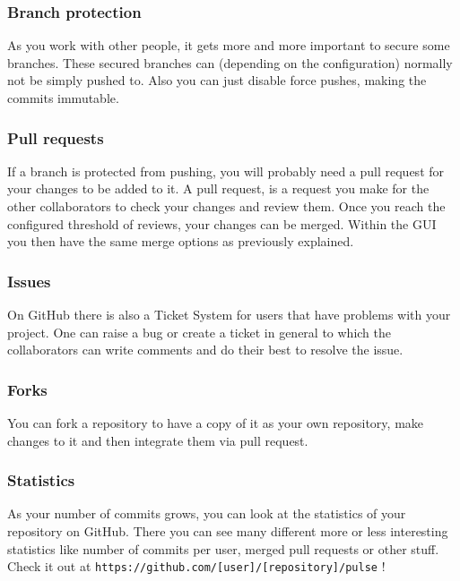 \documentclass[a4paper, 12pt]{article}
\begin{document}
		\subsubsection{Branch protection}
		
			As you work with other people, it gets more and more important to secure some branches. These secured branches can (depending on the configuration) normally not be simply pushed to. Also you can just disable force pushes, making the commits immutable.
		
		\subsubsection{Pull requests}
		
			If a branch is protected from pushing, you will probably need a pull request for your changes to be added to it. A pull request, is a request you make for the other collaborators to check your changes and review them. Once you reach the configured threshold of reviews, your changes can be merged. Within the GUI you then have the same merge options as previously explained.
		
		\subsubsection{Issues}
		
			On GitHub there is also a Ticket System for users that have problems with your project. One can raise a bug or create a ticket in general to which the collaborators can write comments and do their best to resolve the issue.

		\subsubsection{Forks}

			You can fork a repository to have a copy of it as your own repository, make changes to it and then integrate them via pull request.

		\subsubsection{Statistics}
	
			As your number of commits grows, you can look at the statistics of your repository on GitHub. There you can see many different more or less interesting statistics like number of commits per user, merged pull requests or other stuff. Check it out at \lstinline|https://github.com/[user]/[repository]/pulse| !
\end{document}

